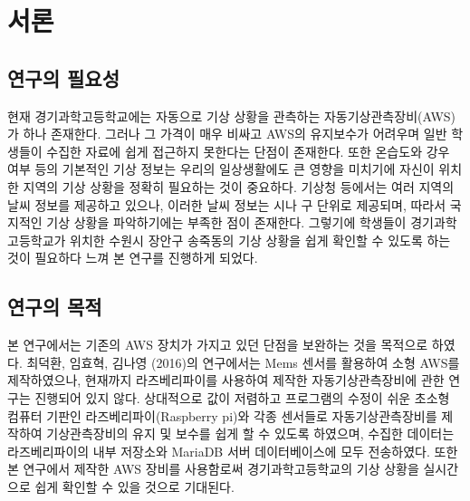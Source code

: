 \section{서론}

\subsection{연구의 필요성}

현재 경기과학고등학교에는 자동으로 기상 상황을 관측하는 자동기상관측장비(AWS)가 하나 존재한다. 그러나 그 가격이 매우 비싸고 AWS의 유지보수가 어려우며 일반 학생들이 수집한 자료에 쉽게 접근하지 못한다는 단점이 존재한다. 또한 온습도와 강우 여부 등의 기본적인 기상 정보는 우리의 일상생활에도 큰 영향을 미치기에 자신이 위치한 지역의 기상 상황을 정확히 필요하는 것이 중요하다. 기상청 등에서는 여러 지역의 날씨 정보를 제공하고 있으나, 이러한 날씨 정보는 시나 구 단위로 제공되며, 따라서 국지적인 기상 상황을 파악하기에는 부족한 점이 존재한다. 그렇기에 학생들이 경기과학고등학교가 위치한 수원시 장안구 송죽동의 기상 상황을 쉽게 확인할 수 있도록 하는 것이 필요하다 느껴 본 연구를 진행하게 되었다.

\subsection{연구의 목적}
본 연구에서는 기존의 AWS 장치가 가지고 있던 단점을 보완하는 것을 목적으로 하였다. 최덕환, 임효혁, 김나영 (2016)의 연구에서는 Mems 센서를 활용하여 소형 AWS를 제작하였으나, 현재까지 라즈베리파이를 사용하여 제작한 자동기상관측장비에 관한 연구는 진행되어 있지 않다.\cite{Ref1} 상대적으로 값이 저렴하고 프로그램의 수정이 쉬운 초소형 컴퓨터 기판인 라즈베리파이(Raspberry pi)와 각종 센서들로 자동기상관측장비를 제작하여 기상관측장비의 유지 및 보수를 쉽게 할 수 있도록 하였으며, 수집한 데이터는 라즈베리파이의 내부 저장소와 MariaDB 서버 데이터베이스에 모두 전송하였다. 또한 본 연구에서 제작한 AWS 장비를 사용함로써 경기과학고등학교의 기상 상황을 실시간으로 쉽게 확인할 수 있을 것으로 기대된다.